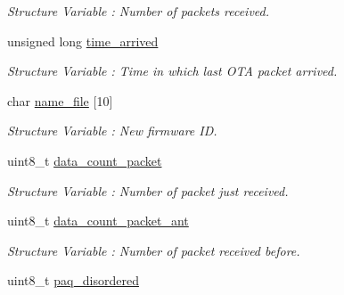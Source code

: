 \begin{DoxyCompactItemize}
\begin{DoxyCompactList}\small\item\em Structure Variable \+: Number of packets received. \end{DoxyCompactList}\item 
unsigned long \hyperlink{structfirmware__struct_a04bbf5110f781e6348218a430831f149}{time\+\_\+arrived}\hypertarget{structfirmware__struct_a04bbf5110f781e6348218a430831f149}{}\label{structfirmware__struct_a04bbf5110f781e6348218a430831f149}

\begin{DoxyCompactList}\small\item\em Structure Variable \+: Time in which last O\+TA packet arrived. \end{DoxyCompactList}\item 
char \hyperlink{structfirmware__struct_a5b43ec3a74af2fc0f99955d8ae2570fd}{name\+\_\+file} \mbox{[}10\mbox{]}\hypertarget{structfirmware__struct_a5b43ec3a74af2fc0f99955d8ae2570fd}{}\label{structfirmware__struct_a5b43ec3a74af2fc0f99955d8ae2570fd}

\begin{DoxyCompactList}\small\item\em Structure Variable \+: New firmware ID. \end{DoxyCompactList}\item 
uint8\+\_\+t \hyperlink{structfirmware__struct_a612db592d4ad029a4ee1163780d23229}{data\+\_\+count\+\_\+packet}\hypertarget{structfirmware__struct_a612db592d4ad029a4ee1163780d23229}{}\label{structfirmware__struct_a612db592d4ad029a4ee1163780d23229}

\begin{DoxyCompactList}\small\item\em Structure Variable \+: Number of packet just received. \end{DoxyCompactList}\item 
uint8\+\_\+t \hyperlink{structfirmware__struct_a9aecde32e8933d1bc8e5498a72f83732}{data\+\_\+count\+\_\+packet\+\_\+ant}\hypertarget{structfirmware__struct_a9aecde32e8933d1bc8e5498a72f83732}{}\label{structfirmware__struct_a9aecde32e8933d1bc8e5498a72f83732}

\begin{DoxyCompactList}\small\item\em Structure Variable \+: Number of packet received before. \end{DoxyCompactList}\item 
uint8\+\_\+t \hyperlink{structfirmware__struct_aec56304e2d1f926a426f096242b7be7c}{paq\+\_\+disordered}\hypertarget{structfirmware__struct_aec56304e2d1f926a426f096242b7be7c}{}\label{structfirmware__struct_aec56304e2d1f926a426f096242b7be7c}


\end{DoxyCompactItemize}
